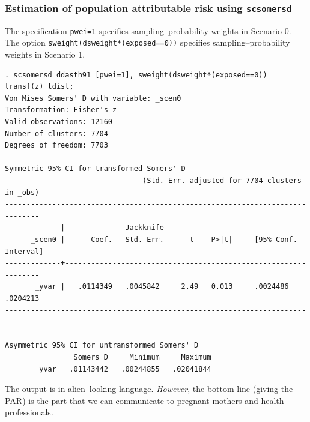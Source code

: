 \documentclass[11pt]{beamer}
\begin{document}
\begin{frame}[fragile]
\frametitle{Estimation of population attributable risk using \texttt{scsomersd}}

The specification \texttt{pwei=1} specifies sampling--probability weights in Scenario 0.
The option \texttt{sweight(dsweight*(exposed==0))} specifies sampling--probability weights
in Scenario 1.

\tiny
\begin{verbatim}
. scsomersd ddasth91 [pwei=1], sweight(dsweight*(exposed==0)) transf(z) tdist;
Von Mises Somers' D with variable: _scen0
Transformation: Fisher's z
Valid observations: 12160
Number of clusters: 7704
Degrees of freedom: 7703

Symmetric 95% CI for transformed Somers' D
                                (Std. Err. adjusted for 7704 clusters in _obs)
------------------------------------------------------------------------------
             |              Jackknife
      _scen0 |      Coef.   Std. Err.      t    P>|t|     [95% Conf. Interval]
-------------+----------------------------------------------------------------
       _yvar |   .0114349   .0045842     2.49   0.013     .0024486    .0204213
------------------------------------------------------------------------------

Asymmetric 95% CI for untransformed Somers' D
                Somers_D     Minimum     Maximum 
       _yvar   .01143442   .00244855   .02041844 
\end{verbatim}
\normalsize

The output is in alien--looking language.
\textit{However}, the bottom line (giving the PAR)
is the part that we can communicate to pregnant mothers and health professionals.

\end{frame}
\end{document}

